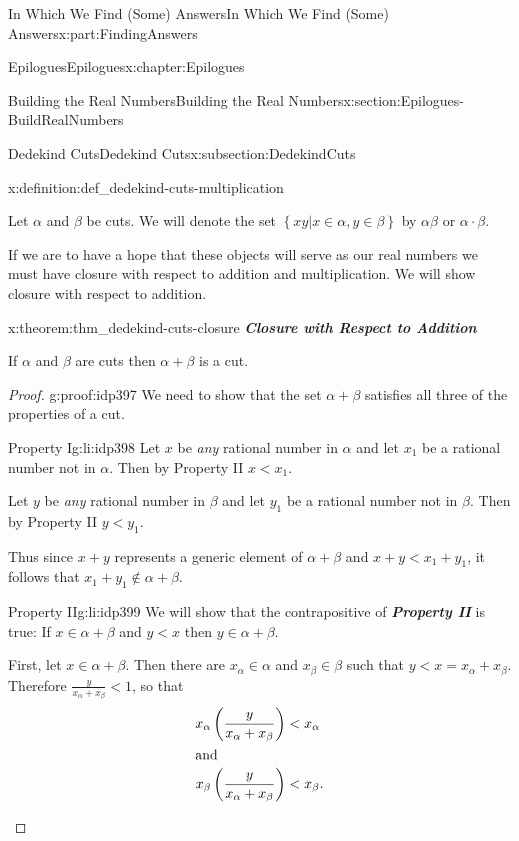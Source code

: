 \documentclass[oneside,10pt,]{book}
\newcommand{\alert}[1]{\textbf{\textit{#1}}}
\numberwithin{equation}{section}
\newcommand{\lt}{<}
\newcommand{\amp}{&}
\begin{document}
\begin{partptx}{In Which We Find (Some) Answers}{}{In Which We Find (Some) Answers}{}{}{x:part:FindingAnswers}
\begin{chapterptx}{Epilogues}{}{Epilogues}{}{}{x:chapter:Epilogues}
\begin{sectionptx}{Building the Real Numbers}{}{Building the Real Numbers}{}{}{x:section:Epilogues-BuildRealNumbers}
\begin{subsectionptx}{Dedekind Cuts}{}{Dedekind Cuts}{}{}{x:subsection:DedekindCuts}
\begin{definition}{}{x:definition:def_dedekind-cuts-multiplication}
\par
{} Let \(\alpha\) and \(\beta\) be cuts. We will denote the set \(\left\{xy|x\in\alpha,
y\in\beta\right\}\) by \(\alpha\beta \text{ or } \alpha\cdot\beta\).%
\end{definition}
If we are to have a hope that these objects will serve as our real numbers we must have closure with respect to addition and multiplication. We will show closure with respect to addition.%
\begin{theorem}{}{}{x:theorem:thm_dedekind-cuts-closure}%
\alert{Closure with Respect to Addition}%
\par
{} If \(\alpha\) and \(\beta\) are cuts then \(\alpha+\beta\) is a cut.%
\end{theorem}
\begin{proof}{}{g:proof:idp397}
We need to show that the set \(\alpha+\beta\) satisfies all three of the properties of a cut.%
\par
%
\begin{descriptionlist}
\begin{dlimedium}{Property I}{g:li:idp398}%
Let \(x\) be \emph{any} rational number in \(\alpha\) and let \(x_1\) be a rational number not in \(\alpha\).  Then by Property II \(x\lt x_1\).%
\par
Let \(y\) be \emph{any} rational number in \(\beta\) and let \(y_1\) be a rational number not in \(\beta\).  Then by Property II \(y\lt
y_1\).%
\par
Thus since \(x+y\) represents a generic element of \(\alpha+\beta\) and \(x+y\lt x_1+y_1\), it follows that \(x_1+y_1\not\in\alpha+\beta\).%
\end{dlimedium}%
\begin{dlimedium}{Property II}{g:li:idp399}%
We will show that the contrapositive of \alert{Property II} is true: If \(x\in\alpha+\beta\) and \(y\lt x\) then \(y\in\alpha+\beta\).%
\par
First, let \(x\in\alpha+\beta\). Then there are \(x_\alpha\in\alpha\) and \(x_\beta\in\beta\) such that \(y\lt x=x_\alpha+x_\beta\). Therefore \(\frac{y}{x_\alpha+x_\beta}\lt  1\), so that%
\begin{align*}
x_\alpha\left(\frac{y}{x_\alpha+x_\beta}\right)\amp \lt  x_\alpha\\
\intertext{and}
x_\beta\left(\frac{y}{x_\alpha+x_\beta}\right)\amp \lt  x_\beta\text{.}
\end{align*}
%
\par

\end{dlimedium}
\end{descriptionlist}
\end{proof}
\end{subsectionptx}
\end{sectionptx}
\end{chapterptx}
\end{partptx}
\end{document}
